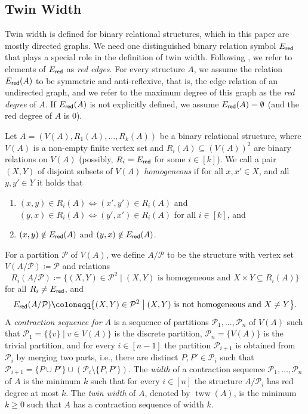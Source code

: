 \documentclass{theoretics}
\newcommand{\CP}{{\mathcal P}}
\newcommand{\bigmid}{\;\big|\;}
\newcommand{\Ered}{E_{\sf red}}
\DeclareMathOperator{\tww}{tww}
\begin{document}
\subsection{Twin Width}
\label{sec:tww}

Twin width \cite{BonnetKTW22} is defined for binary relational structures, which in this paper are mostly directed graphs.
We need one distinguished binary relation symbol $\Ered$ that plays a special role in the definition of twin width.
Following \cite{BonnetKTW22}, we refer to elements of $\Ered$ as \emph{red edges}.
For every structure $A$, we assume the relation $\Ered(A)$ to be symmetric and anti-reflexive, that is, the edge relation of an undirected graph, and we refer to the maximum degree of this graph as the \emph{red degree} of $A$.
If $\Ered(A)$ is not explicitly defined, we assume $\Ered(A)=\emptyset$ (and the red degree of $A$ is $0$).

Let $A = (V(A),R_1(A),\dots,R_k(A))$ be a binary relational structure, where $V(A)$ is a non-empty finite vertex set and $R_i(A) \subseteq (V(A))^2$ are binary relations on $V(A)$ (possibly, $R_i=\Ered$ for some $i \in [k]$).
We call a pair $(X,Y)$ of disjoint subsets of $V(A)$ \emph{homogeneous} if for all $x,x'\in X$, and all $y,y'\in Y$ it holds that
\begin{enumerate}[label = (\roman*)]
 \item $(x,y)\in R_i(A) \Leftrightarrow (x',y') \in R_i(A)$ and $(y,x) \in R_i(A) \Leftrightarrow (y',x') \in R_i(A)$ for all $i \in [k]$, and
 \item $(x,y) \notin \Ered(A)$ and $(y,x) \notin \Ered(A)$.
\end{enumerate}
For a partition $\CP$ of $V(A)$, we define $A/\CP$ to be the structure with vertex set $V(A/\CP) \coloneqq \CP$ and relations
\[R_i(A/\CP) \coloneqq \big\{(X,Y) \in \CP^2 \bigmid (X,Y) \text{ is homogeneous and } X \times Y\subseteq R_i(A)\big\}\]
for all $R_i \neq \Ered$, and
\[\Ered(A/\CP) \coloneqq \big\{(X,Y) \in \CP^2 \bigmid (X,Y) \text{ is not homogeneous and } X \neq Y\big\}.\]
A \emph{contraction sequence for $A$} is a sequence of partitions
$\CP_1,\dots,\CP_n$ of $V(A)$ such that $\CP_1 = \{\{v\} \mid v \in V(A)\}$ is the discrete partition, $\CP_n = \{V(A)\}$ is the trivial partition,
and for every $i \in [n-1]$ the partition $\CP_{i+1}$ is obtained from $\CP_i$ by merging two parts, i.e.,
there are distinct $P,P' \in \CP_i$ such that $\CP_{i+1} = \{P \cup P'\} \cup (\CP_{i} \setminus \{P,P'\})$.
The \emph{width} of a contraction sequence $\CP_1,\dots,\CP_n$ of $A$ is the minimum $k$ such that for every $i \in [n]$ the structure $A/\CP_i$ has red degree at most $k$.
The \emph{twin width} of $A$, denoted by $\tww(A)$, is the minimum $k \geq 0$ such that $A$ has a contraction sequence of width $k$.
\end{document}
